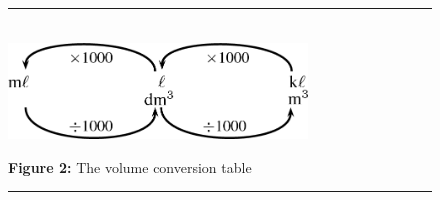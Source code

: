     \setcounter{subfigure}{0}


	\begin{figure}[H] %
    \begin{center}
    \rule[.1in]{\figurerulewidth}{.005in} \\
        \label{m30853*uid56!!!underscore!!!media}\label{m30853*uid56!!!underscore!!!printimage}\includegraphics[width=300px]{col11305.imgs/m30853_PG10C1_002.png} %
        
      \vspace{2pt}
    \vspace{\rubberspace}\par \begin{cnxcaption}
	  \small \textbf{Figure 2: }The volume conversion table
	\end{cnxcaption}
      
    \vspace{.1in}
    \rule[.1in]{\figurerulewidth}{.005in} \\
        
    \end{center}

 \end{figure}   

    \addtocounter{footnote}{-0}
    
\par
            \label{m30853*secfhsst!!!underscore!!!id1083}\vspace{.5cm} 
      
      \pagebreak

